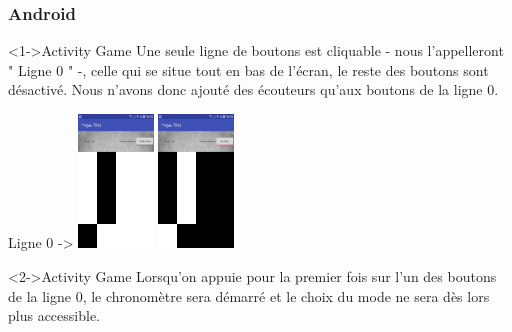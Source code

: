 \documentclass{beamer}
\begin{document}
\begin{frame}
\frametitle<1->{Android}
\begin{block}<1->{Activity Game}
	Une seule ligne de boutons est cliquable - nous l'appelleront " {\color{red} Ligne 0} " -, celle qui se situe tout
en bas de l'écran, le reste des boutons sont désactivé. Nous n'avons donc ajouté des écouteurs
qu'aux boutons de la ligne 0.

\end{block}

   \begin{center}Ligne 0 ->
      \includegraphics[width=20mm]{AndroidGame}
      \includegraphics[width=20mm]{AndroidGameInvers}

    \end{center}

\begin{exampleblock}<2->{Activity Game}
	     {\small Lorsqu'on appuie pour la premier fois sur l'un des boutons de la ligne 0,
 { \color {red}le chronomètre sera démarré} et le choix du mode ne sera dès lors {\color {red} plus accessible}.}



\end{exampleblock}
   
\end{frame}

\end{document}
